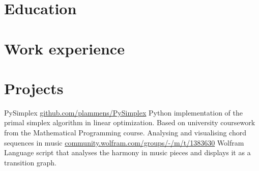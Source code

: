 \documentclass[]{resume}
\begin{document}
\makeprofile







\newcommand{\itemwidth}{10cm}
\newcommand{\chronowidth}{2.5cm}


\begin{adjustwidth}{10pt}{10pt}

\section*{Education}


\renewcommand{\twentylen}{\itemwidth}
\begin{twenty}[\chronowidth]
    
\end{twenty}



\section*{Work experience}
\renewcommand{\twentylen}{\itemwidth}
\begin{twenty}[\chronowidth]
    
    
\end{twenty}


\section*{Projects}

\renewcommand{\twentylen}{\itemwidth}
\begin{twenty}[\chronowidth]
      {PySimplex}
      {\href{https://github.com/plammens/PySimplex}{github.com/plammens/PySimplex}}
      {Python implementation of the primal simplex algorithm in linear optimization. Based on university coursework from the Mathematical Programming course.}
      {Analysing and visualising chord sequences in music}
      {\href{https://community.wolfram.com/groups/-/m/t/1383630}{community.wolfram.com/groups/-/m/t/1383630}}
      {Wolfram Language script that analyses the harmony in music pieces and displays it as a transition graph.}
\end{twenty}




\end{adjustwidth}
\end{document}
